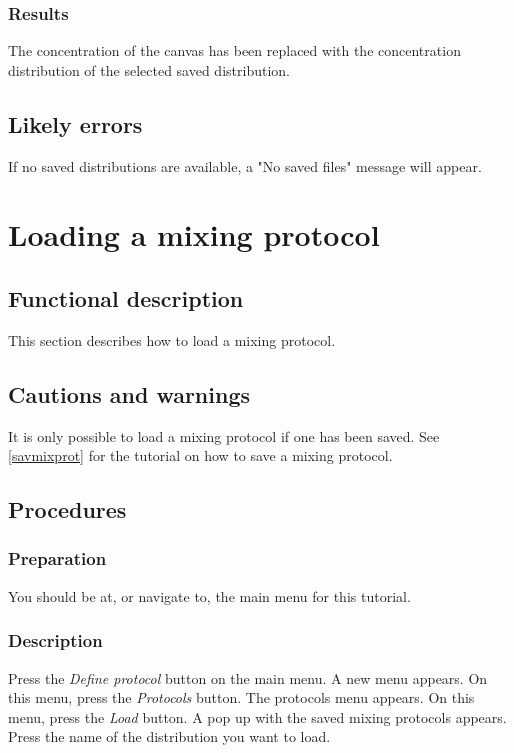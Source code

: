 \subsubsection{Results}
The concentration of the canvas has been replaced with the concentration distribution of the selected saved distribution.

\subsection{Likely errors}
If no saved distributions are available, a "No saved files" message will appear. 


\section{Loading a mixing protocol}
\label{sec:loadMixProt}

\subsection{Functional description}
This section describes how to load a mixing protocol.

\subsection{Cautions and warnings}
It is only possible to load a mixing protocol if one has been saved. See \ref{savmixprot} for the tutorial on how to save a mixing protocol.

\subsection{Procedures}
\subsubsection{Preparation}
You should be at, or navigate to, the main menu for this tutorial.

\subsubsection{Description}
Press the \emph{Define protocol} button on the main menu. A new menu appears. On this menu, press the \emph{Protocols} button. The protocols menu appears. On this menu, press the \emph{Load} button. A pop up with the saved mixing protocols appears. Press the name of the distribution you want to load.

